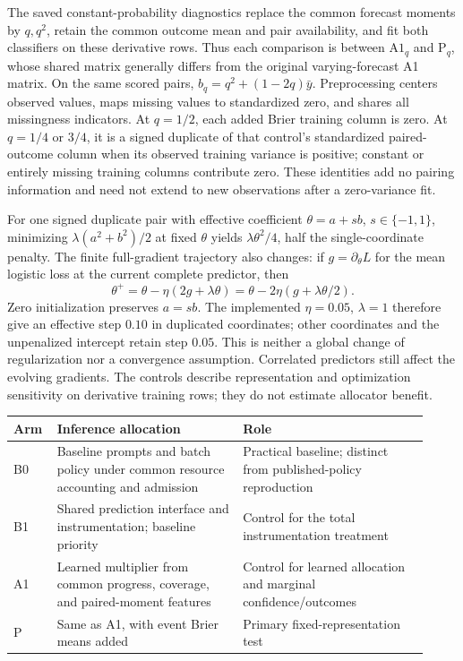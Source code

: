 \documentclass[11pt]{article}
\begin{document}
The saved constant-probability diagnostics replace the common forecast moments by $q,q^2$, retain the common outcome mean and pair availability, and fit both classifiers on these derivative rows. Thus each comparison is between $\mathrm{A1}_q$ and $\mathrm{P}_q$, whose shared matrix generally differs from the original varying-forecast A1 matrix. On the same scored pairs, $b_q=q^2+(1-2q)\bar y$. Preprocessing centers observed values, maps missing values to standardized zero, and shares all missingness indicators. At $q=1/2$, each added Brier training column is zero. At $q=1/4$ or $3/4$, it is a signed duplicate of that control's standardized paired-outcome column when its observed training variance is positive; constant or entirely missing training columns contribute zero. These identities add no pairing information and need not extend to new observations after a zero-variance fit.

For one signed duplicate pair with effective coefficient $\theta=a+s b$, $s\in\{-1,1\}$, minimizing $\lambda(a^2+b^2)/2$ at fixed $\theta$ yields $\lambda\theta^2/4$, half the single-coordinate penalty. The finite full-gradient trajectory also changes: if $g=\partial_\theta L$ for the mean logistic loss at the current complete predictor, then
\[
\theta^{+}=\theta-\eta(2g+\lambda\theta)
=\theta-2\eta(g+\lambda\theta/2).
\]
Zero initialization preserves $a=s b$. The implemented $\eta=0.05$, $\lambda=1$ therefore give an effective step $0.10$ in duplicated coordinates; other coordinates and the unpenalized intercept retain step $0.05$. This is neither a global change of regularization nor a convergence assumption. Correlated predictors still affect the evolving gradients. The controls describe representation and optimization sensitivity on derivative training rows; they do not estimate allocator benefit.

\begin{center}
\small
\begin{tabular}{@{}p{0.08\linewidth}p{0.42\linewidth}p{0.42\linewidth}@{}}
\toprule
Arm & Inference allocation & Role \\
\midrule
B0 & Baseline prompts and batch policy under common resource accounting and admission & Practical baseline; distinct from published-policy reproduction \\
B1 & Shared prediction interface and instrumentation; baseline priority & Control for the total instrumentation treatment \\
A1 & Learned multiplier from common progress, coverage, and paired-moment features & Control for learned allocation and marginal confidence/outcomes \\
P & Same as A1, with event Brier means added & Primary fixed-representation test \\
\bottomrule
\end{tabular}
\end{center}
\end{document}
